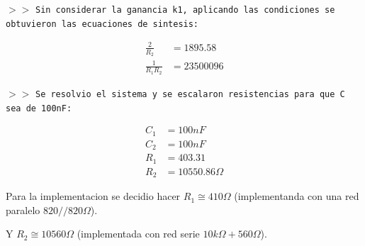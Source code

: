 \noindent $>>$ \texttt{Sin considerar la ganancia k1, aplicando las condiciones se obtuvieron las ecuaciones de sintesis:}

\begin{align*}
    \frac{2}{R_{2}} &= 1895.58 \\
    \frac{1}{R_{1} R_{2}} &= 23500096
\end{align*}

\noindent $>>$ \texttt{Se resolvio el sistema y se escalaron resistencias para que C sea de 100nF:}

\begin{align*}
    C_{1} &= 100 nF \\
    C_{2} &= 100 nF \\
    R_1 &= 403.31 \\
    R_2 &= 10550.86 \Omega
\end{align*}

Para la implementacion se decidio hacer $R_1\cong 410\Omega$ (implementanda con una red paralelo $820//820\Omega$).

Y $R_2\cong 10560\Omega$ (implementada con red serie $10k\Omega+560\Omega$).